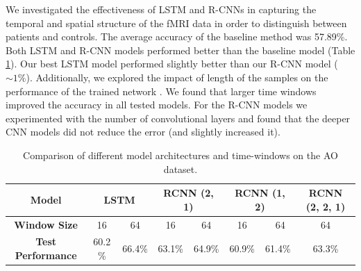 \documentclass{article}
\begin{document}
We investigated the effectiveness of LSTM and R-CNNs in capturing the temporal and spatial structure of the fMRI data in order to distinguish between patients and controls. The average accuracy of the baseline method was 57.89\%. 
Both LSTM and R-CNN models performed better than the baseline model (Table \ref{table_1}). Our best LSTM model performed slightly better than our R-CNN model ($ \sim 1\%$). Additionally, we explored the impact of length of the samples on the performance of the trained network . We found that larger time windows improved the accuracy in all tested models. For the R-CNN models we experimented with the number of convolutional layers and found that the deeper CNN models did not reduce the error (and slightly increased it). 


\begin{table}[h]
\centering
\caption{Comparison of different model architectures and time-windows on the AO dataset.}
\label{table_1}
\begin{tabular}{ c c c c c c c c }
\hline
\textbf{Model}           & \multicolumn{2}{c}{\textbf{LSTM}} &
\multicolumn{2}{c}{\textbf{RCNN (2, 1)}} & \multicolumn{2}{c}{\textbf{RCNN (1, 2)}} & \textbf{RCNN (2, 2, 1)} \\ \hline
\textbf{Window Size}      & 16   & 64  & 16  & 64    &16    & \ 64    & 64           \\ \hline
\textbf{Test Performance} & 60.2 \%   & 66.4\%   & 63.1\% & 64.9\% & 60.9\%  & 61.4\%  & 63.3\%  \\  \hline
\end{tabular}
\end{table}
\end{document}
